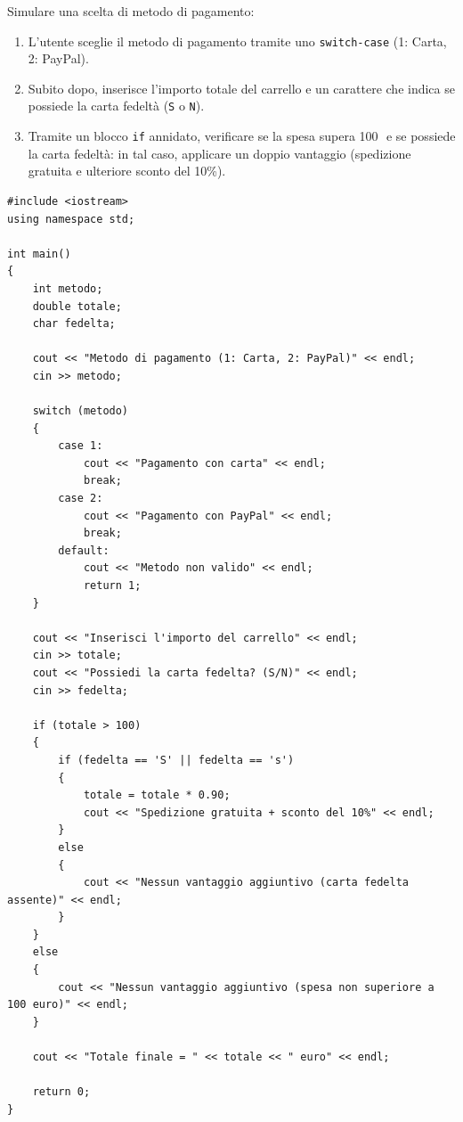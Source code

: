 \documentclass[11pt,fleqn]{book}
\begin{document}
\begin{esercizio}[3]
    Simulare una scelta di metodo di pagamento:
    \begin{enumerate}
        \item L'utente sceglie il metodo di pagamento tramite uno \texttt{switch-case} (1: Carta, 2: PayPal).
        \item Subito dopo, inserisce l'importo totale del carrello e un carattere che indica se possiede la carta fedeltà (\texttt{S} o \texttt{N}).
        \item Tramite un blocco \texttt{if} annidato, verificare se la spesa supera 100\,\texteuro\ e se possiede la carta fedeltà: in tal caso, applicare un doppio vantaggio (spedizione gratuita e ulteriore sconto del 10\%).
    \end{enumerate}
    \ifsoluzioni
    \solution
    \begin{lstlisting}[style=cpp]
#include <iostream>
using namespace std;

int main()
{
    int metodo;
    double totale;
    char fedelta;

    cout << "Metodo di pagamento (1: Carta, 2: PayPal)" << endl;
    cin >> metodo;

    switch (metodo)
    {
        case 1:
            cout << "Pagamento con carta" << endl;
            break;
        case 2:
            cout << "Pagamento con PayPal" << endl;
            break;
        default:
            cout << "Metodo non valido" << endl;
            return 1;
    }

    cout << "Inserisci l'importo del carrello" << endl;
    cin >> totale;
    cout << "Possiedi la carta fedelta? (S/N)" << endl;
    cin >> fedelta;

    if (totale > 100)
    {
        if (fedelta == 'S' || fedelta == 's')
        {
            totale = totale * 0.90;
            cout << "Spedizione gratuita + sconto del 10%" << endl;
        }
        else
        {
            cout << "Nessun vantaggio aggiuntivo (carta fedelta assente)" << endl;
        }
    }
    else
    {
        cout << "Nessun vantaggio aggiuntivo (spesa non superiore a 100 euro)" << endl;
    }

    cout << "Totale finale = " << totale << " euro" << endl;

    return 0;
}
    \end{lstlisting}
    \fi
\end{esercizio}
\end{document}
